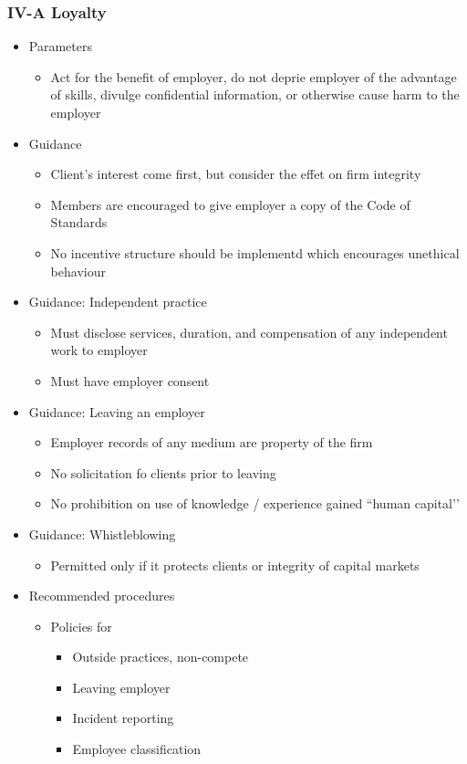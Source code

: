 \documentclass[../notes_compiled.tex]{subfiles}
\begin{document}
\subsubsection{IV-A Loyalty}
\begin{itemize}
\item Parameters
\begin{itemize}
\item Act for the benefit of employer, do not deprie employer of the advantage of skills, divulge confidential information, or otherwise cause harm to the employer
\end{itemize}
\item Guidance
\begin{itemize}
\item Client’s interest come first, but consider the effet on firm integrity
\item Members are encouraged to give employer a copy of the Code of Standards
\item No incentive structure should be implementd which encourages unethical behaviour
\end{itemize}
\item Guidance: Independent practice
\begin{itemize}
\item Must disclose services, duration, and compensation of any independent work to employer
\item Must have employer consent
\end{itemize}
\item Guidance: Leaving an employer
\begin{itemize}
\item Employer records of any medium are property of the firm
\item No solicitation fo clients prior to leaving
\item No prohibition on use of knowledge / experience gained ``human capital’’
\end{itemize}
\item Guidance: Whistleblowing
\begin{itemize}
\item Permitted only if it protects clients or integrity of capital markets
\end{itemize}
\item Recommended procedures
\begin{itemize}
\item Policies for
\begin{itemize}
\item Outside practices, non-compete
\item Leaving employer
\item Incident reporting
\item Employee classification
\end{itemize}
\end{itemize}
\end{itemize}
\end{document}
